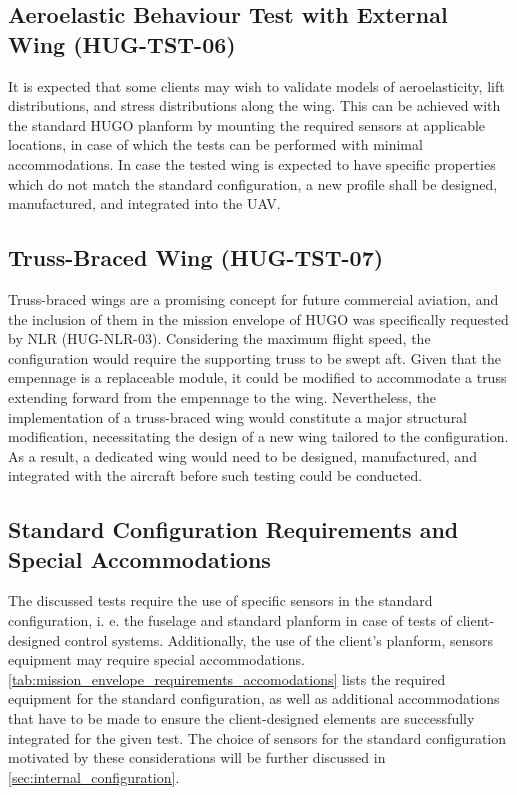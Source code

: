 \subsection{Aeroelastic Behaviour Test with External Wing (HUG-TST-06)}
It is expected that some clients may wish to validate models of aeroelasticity, lift distributions, and stress distributions along the wing. This can be achieved with the standard HUGO planform by mounting the required sensors at applicable locations, in case of which the tests can be performed with minimal accommodations. In case the tested wing is expected to have specific properties which do not match the standard configuration, a new profile shall be designed, manufactured, and integrated into the UAV.


\subsection{Truss-Braced Wing (HUG-TST-07)}
Truss-braced wings are a promising concept for future commercial aviation, and the inclusion of them in the mission envelope of HUGO was specifically requested by NLR (HUG-NLR-03). Considering the maximum flight speed, the configuration would require the supporting truss to be swept aft. Given that the empennage is a replaceable module, it could be modified to accommodate a truss extending forward from the empennage to the wing. Nevertheless, the implementation of a truss-braced wing would constitute a major structural modification, necessitating the design of a new wing tailored to the configuration. As a result, a dedicated wing would need to be designed, manufactured, and integrated with the aircraft before such testing could be conducted.







\subsection{Standard Configuration Requirements and Special Accommodations}
The discussed tests require the use of specific sensors in the standard configuration, i. e. the fuselage and standard planform in case of tests of client-designed control systems. Additionally, the use of the client's planform, sensors equipment may require special accommodations. \autoref{tab:mission_envelope_requirements_accomodations} lists the required equipment for the standard configuration, as well as additional accommodations that have to be made to ensure the client-designed elements are successfully integrated for the given test. The choice of sensors for the standard configuration motivated by these considerations will be further discussed in \autoref{sec:internal_configuration}.

